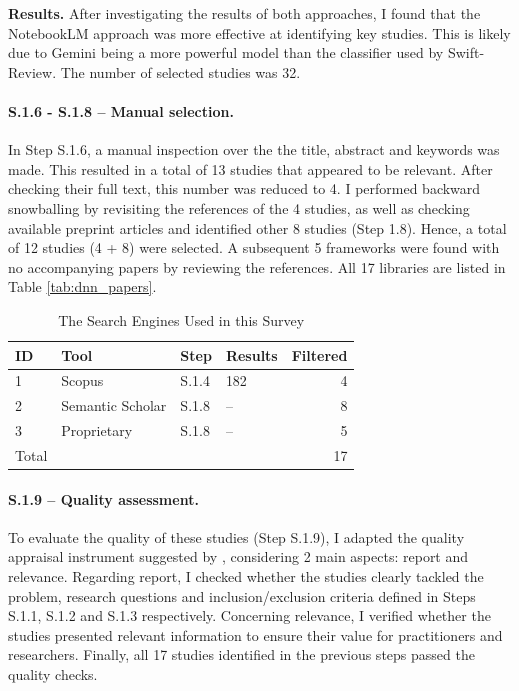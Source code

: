 \textbf{Results.}
After investigating the results of both approaches, I found that the NotebookLM approach was more
effective at identifying key studies. This is likely due to Gemini being a more powerful
model than the classifier used by Swift-Review. The number of selected studies was 32.
  


\paragraph{S.1.6 - S.1.8 -- Manual selection.}
In Step S.1.6, a manual inspection over the the title, abstract and keywords was made. This
resulted in a total of 13 studies that appeared to be relevant. After checking their full text,
this number was reduced to 4. I performed backward snowballing \cite{jalali_systematic_2012} by
revisiting the references of the 4 studies, as well as checking available preprint articles and
identified other 8 studies (Step 1.8). Hence, a total of 12 studies (4 + 8) were selected. A
subsequent 5 frameworks were found with no accompanying papers by reviewing the references. All 17
libraries are listed in Table \ref{tab:dnn_papers}.

\begin{table}[h!]
	\centering
	\caption{The Search Engines Used in this Survey}
	\label{tab:databases}
	\begin{tabular}{llllr}
		\hline
		ID    & Tool             & Step  & Results & Filtered \\
		\hline
		1     & Scopus           & S.1.4 & 182     & 4        \\
		2     & Semantic Scholar & S.1.8 & --      & 8        \\
		3     & Proprietary      & S.1.8 & --      & 5        \\
		\hline
		Total &                  &       &         & 17       \\
	\end{tabular}
\end{table}

\paragraph{S.1.9 -- Quality assessment.}
To evaluate the quality of these studies (Step S.1.9), I adapted the quality appraisal instrument
suggested by \cite{zhou_map_2016}, considering 2 main aspects: report and relevance. Regarding
report, I checked whether the studies clearly tackled the problem, research questions and
inclusion/exclusion criteria defined in Steps S.1.1, S.1.2 and S.1.3 respectively. Concerning
relevance, I verified whether the studies presented relevant information to ensure their value for
practitioners and researchers. Finally, all 17 studies identified in the previous steps passed the
quality checks.

